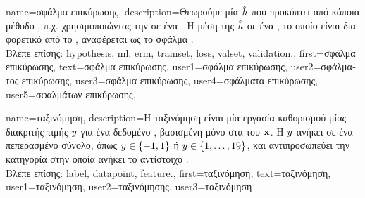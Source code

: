 {name={\foreignlanguage{greek}{σφάλμα επικύρωσης}},
	description={\foreignlanguage{greek}{Θεωρούμε μία}  $\hat{h}$ 
		\foreignlanguage{greek}{που προκύπτει από κάποια μέθοδο} , \foreignlanguage{greek}{π.χ. χρησιμοποιώντας την}  
		\foreignlanguage{greek}{σε ένα} . \foreignlanguage{greek}{Η μέση}  \foreignlanguage{greek}{της}
 		$\hat{h}$ \foreignlanguage{greek}{σε ένα} , \foreignlanguage{greek}{το οποίο είναι διαφορετικό από το} , 
		\foreignlanguage{greek}{αναφέρεται ως το σφάλμα} .\\
		\foreignlanguage{greek}{Βλέπε επίσης:} \gls{hypothesis}, \gls{ml}, \gls{erm}, \gls{trainset}, \gls{loss}, \gls{valset}, \gls{validation}.},
	first={\foreignlanguage{greek}{σφάλμα επικύρωσης}},
	text={\foreignlanguage{greek}{σφάλμα επικύρωσης}},
	user1={\foreignlanguage{greek}{σφάλμα επικύρωσης}}, %
	user2={\foreignlanguage{greek}{σφάλματος επικύρωσης}}, %
	user3={\foreignlanguage{greek}{σφάλμα επικύρωσης}}, %
	user4={\foreignlanguage{greek}{σφάλματα επικύρωσης}}, %
	user5={\foreignlanguage{greek}{σφαλμάτων επικύρωσης}}, %
}

{name={\foreignlanguage{greek}{ταξινόμηση}},
	description={\foreignlanguage{greek}{Η ταξινόμηση είναι μία εργασία καθορισμού} 
 		\foreignlanguage{greek}{μίας}  \foreignlanguage{greek}{διακριτής τιμής} $y$ 
		\foreignlanguage{greek}{για ένα δεδομένο} , \foreignlanguage{greek}{βασισμένη μόνο στα}  
 		 \foreignlanguage{greek}{του} ${\bf x}$. \foreignlanguage{greek}{Η}  $y$ 
		\foreignlanguage{greek}{ανήκει σε ένα πεπερασμένο σύνολο, όπως  
 		$y \in \{-1,1\}$ ή $y \in \{1, \ldots, 19\}$, και αντιπροσωπεύει την κατηγορία στην οποία ανήκει το  
 		αντίστοιχο} .\\
		\foreignlanguage{greek}{Βλέπε επίσης:} \gls{label}, \gls{datapoint}, \gls{feature}.},
	first={\foreignlanguage{greek}{ταξινόμηση}},
	text={\foreignlanguage{greek}{ταξινόμηση}},
	user1={\foreignlanguage{greek}{ταξινόμηση}}, %
	user2={\foreignlanguage{greek}{ταξινόμησης}}, %
	user3={\foreignlanguage{greek}{ταξινόμηση}} %
}

